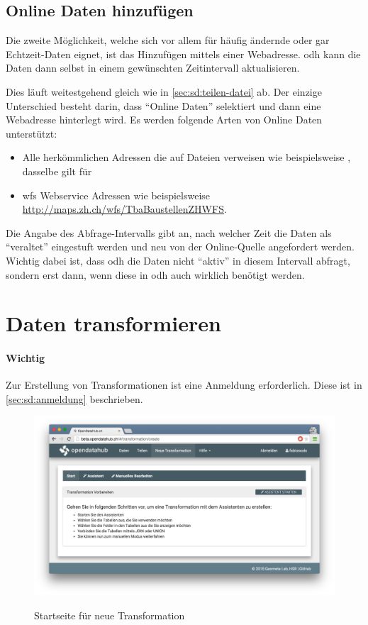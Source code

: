\subsection{Online Daten hinzufügen}

Die zweite Möglichkeit, welche sich vor allem für häufig ändernde oder gar Echtzeit-Daten eignet, ist das Hinzufügen mittels einer Webadresse. \acl{odh} kann die Daten dann selbst in einem gewünschten Zeitintervall aktualisieren.

Dies läuft weitestgehend gleich wie in \cref{sec:sd:teilen-datei} ab. Der einzige Unterschied besteht darin, dass ``Online Daten'' selektiert und dann eine Webadresse hinterlegt wird. Es werden folgende Arten von Online Daten unterstützt:

\begin{itemize}
\item Alle herkömmlichen Adressen die auf Dateien verweisen wie beispielsweise , dasselbe gilt für 
\item \gls{wfs} Webservice Adressen wie beispielsweise \url{http://maps.zh.ch/wfs/TbaBaustellenZHWFS}.
\end{itemize}

Die Angabe des Abfrage-Intervalls gibt an, nach welcher Zeit die Daten als ``veraltet'' eingestuft werden und neu von der Online-Quelle angefordert werden. Wichtig dabei ist, dass \acl{odh} die Daten nicht ``aktiv'' in diesem Intervall abfragt, sondern erst dann, wenn diese in \acl{odh} auch wirklich benötigt werden.

\section{Daten transformieren}
\paragraph{Wichtig} Zur Erstellung von Transformationen ist eine Anmeldung erforderlich. Diese ist in \vref{sec:sd:anmeldung} beschrieben.

\begin{figure}[H]
	\centering
	\includegraphics[width=\linewidth]{fig/screenshot-neue-transformation}
	\label{fig:sd:screenshot-neue-transformation}
	\caption{Startseite für neue Transformation}
\end{figure}

